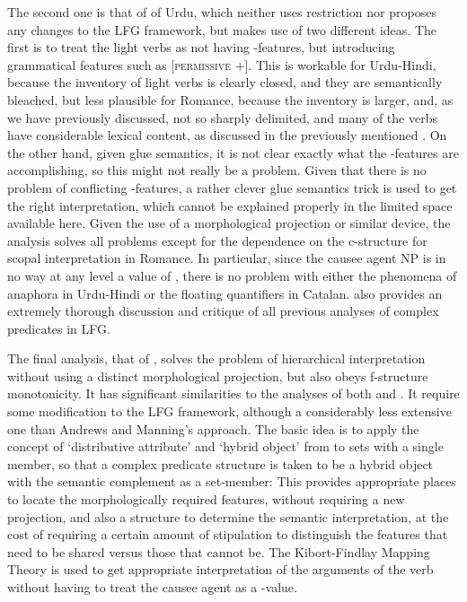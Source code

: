 \documentclass[output=paper,hidelinks]{langscibook}
\begin{document}
The second one is that of \citet{Lowe2015} of Urdu, which neither uses
restriction nor proposes any changes to the LFG framework, but makes use
of two different ideas.  The first is to treat the light verbs as not having {\PRED}-features,
but introducing grammatical features such as \textsc{[permissive +]}.  This is
workable for Urdu-Hindi, because the inventory of light verbs is clearly closed,
and they are semantically bleached, but less plausible for Romance, because the inventory
is larger, and, as we have previously discussed, not so sharply delimited, and many of
the verbs have considerable lexical content, as discussed in the previously mentioned
\citet{Sola2002}.  On the other hand, given glue semantics, it is not
clear exactly what the {\PRED}-features are accomplishing, so this might not
really be a problem. Given that there is no problem of conflicting
{\PRED}-features, a rather clever glue semantics trick is used
to get the right interpretation, which cannot be explained properly
in the limited space available here.  Given the use of a morphological
projection or similar device, the analysis solves all problems except for the
dependence on the c-structure for scopal interpretation in Romance.
In particular, since the causee agent NP is in no way at any level a value
of {\SUBJ}, there is no problem with either the phenomena of anaphora in
Urdu-Hindi or the floating quantifiers in Catalan.  \citet{Lowe2015} also provides
an extremely thorough discussion and critique of all previous analyses of complex
predicates in LFG.

The final analysis, that of \citet{Andrews2018shs}, solves the problem of hierarchical
interpretation without using a distinct morphological projection, but also
obeys f-structure monotonicity.  It has significant
similarities to the analyses of both \citet{AndrewsManning1999} and \citet{ButtKing2006}.
It require some modification to the LFG framework, although
a considerably less extensive one than Andrews and Manning's approach.  The basic idea is to
apply the concept of `distributive attribute' and `hybrid object' from
\citet{DalrympleKaplan2000} to sets with a single member, so that a complex predicate
structure is taken to be a hybrid object with the semantic complement as
a set-member:
\ea
{}
\z
This provides appropriate places to locate the morphologically required
features, without requiring a new projection, and also a structure to
determine the semantic interpretation, at the cost of requiring a certain
amount of stipulation to distinguish the features that need to be shared
versus those that cannot be.  The Kibort-Findlay Mapping Theory is used
to get appropriate interpretation of the arguments of the verb without
having to treat the causee agent as a {\SUBJ}-value.
\end{document}
